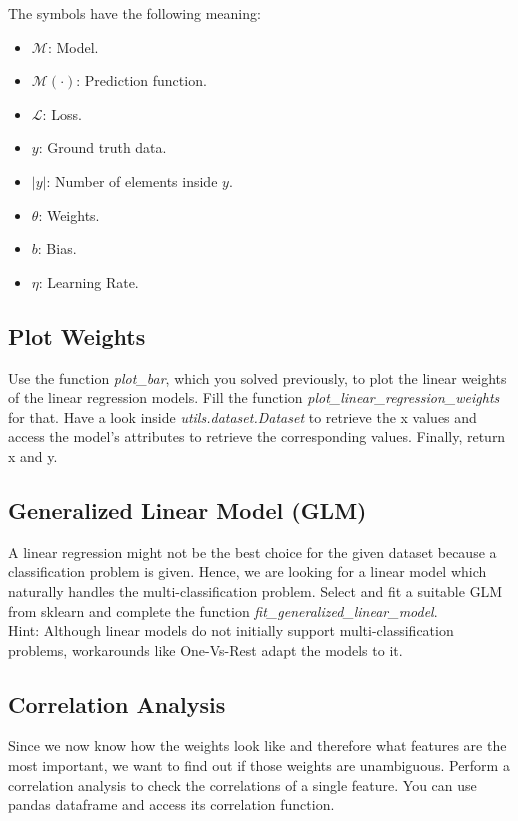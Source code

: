 \documentclass[a4paper]{article}
\begin{document}
\noindent The symbols have the following meaning:

\begin{itemize}
    \item $\mathcal{M}$: Model.
    \item $\mathcal{M}(\cdot)$: Prediction function.
    \item $\mathcal{L}$: Loss.
    \item $y$: Ground truth data.
    \item $|y|$: Number of elements inside $y$.
    \item $\theta$: Weights.
    \item $b$: Bias.
    \item $\eta$: Learning Rate.
\end{itemize}


\subsection{Plot Weights}
Use the function \textit{plot\_bar}, which you solved previously, to plot the linear weights of the linear regression models. Fill the function \textit{plot\_linear\_regression\_weights} for that. Have a look inside \textit{utils.dataset.Dataset} to retrieve the x values and access the model's attributes to retrieve the corresponding values. Finally, return x and y.

\subsection{Generalized Linear Model (GLM)}
A linear regression might not be the best choice for the given dataset because a classification problem is given. Hence, we are looking for a linear model which naturally handles the multi-classification problem. Select and fit a suitable GLM from sklearn and complete the function \textit{fit\_generalized\_linear\_model}.\\

\noindent Hint: Although linear models do not initially support multi-classification problems, workarounds like One-Vs-Rest adapt the models to it.


\subsection{Correlation Analysis}
Since we now know how the weights look like and therefore what features are the most important, we want to find out if those weights are unambiguous. Perform a correlation analysis to check the correlations of a single feature. You can use pandas dataframe and access its correlation function.\\
\end{document}

